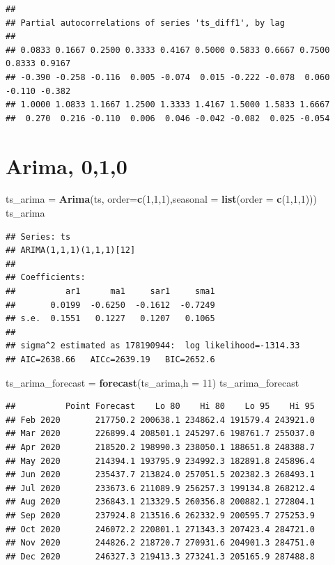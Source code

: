 \documentclass[
]{article}
\newenvironment{Shaded}{\begin{snugshade}}{\end{snugshade}}
\newcommand{\DataTypeTok}[1]{\textcolor[rgb]{0.13,0.29,0.53}{#1}}
\newcommand{\DecValTok}[1]{\textcolor[rgb]{0.00,0.00,0.81}{#1}}
\newcommand{\KeywordTok}[1]{\textcolor[rgb]{0.13,0.29,0.53}{\textbf{#1}}}
\newcommand{\NormalTok}[1]{#1}
\newcommand{\StringTok}[1]{\textcolor[rgb]{0.31,0.60,0.02}{#1}}
\begin{document}
\begin{verbatim}
## 
## Partial autocorrelations of series 'ts_diff1', by lag
## 
## 0.0833 0.1667 0.2500 0.3333 0.4167 0.5000 0.5833 0.6667 0.7500 0.8333 0.9167 
## -0.390 -0.258 -0.116  0.005 -0.074  0.015 -0.222 -0.078  0.060 -0.110 -0.382 
## 1.0000 1.0833 1.1667 1.2500 1.3333 1.4167 1.5000 1.5833 1.6667 
##  0.270  0.216 -0.110  0.006  0.046 -0.042 -0.082  0.025 -0.054
\end{verbatim}

\hypertarget{arima-010}{%
\section{Arima, 0,1,0}\label{arima-010}}

\begin{Shaded}
\begin{Highlighting}[]
\NormalTok{ts_arima =}\StringTok{ }\KeywordTok{Arima}\NormalTok{(ts, }\DataTypeTok{order=}\KeywordTok{c}\NormalTok{(}\DecValTok{1}\NormalTok{,}\DecValTok{1}\NormalTok{,}\DecValTok{1}\NormalTok{),}\DataTypeTok{seasonal =} \KeywordTok{list}\NormalTok{(}\DataTypeTok{order =} \KeywordTok{c}\NormalTok{(}\DecValTok{1}\NormalTok{,}\DecValTok{1}\NormalTok{,}\DecValTok{1}\NormalTok{)))}
\NormalTok{ts_arima}
\end{Highlighting}
\end{Shaded}

\begin{verbatim}
## Series: ts 
## ARIMA(1,1,1)(1,1,1)[12] 
## 
## Coefficients:
##          ar1      ma1     sar1     sma1
##       0.0199  -0.6250  -0.1612  -0.7249
## s.e.  0.1551   0.1227   0.1207   0.1065
## 
## sigma^2 estimated as 178190944:  log likelihood=-1314.33
## AIC=2638.66   AICc=2639.19   BIC=2652.6
\end{verbatim}

\begin{Shaded}
\begin{Highlighting}[]
\NormalTok{ts_arima_forecast =}\StringTok{ }\KeywordTok{forecast}\NormalTok{(ts_arima,}\DataTypeTok{h =} \DecValTok{11}\NormalTok{)}
\NormalTok{ts_arima_forecast}
\end{Highlighting}
\end{Shaded}

\begin{verbatim}
##          Point Forecast    Lo 80    Hi 80    Lo 95    Hi 95
## Feb 2020       217750.2 200638.1 234862.4 191579.4 243921.0
## Mar 2020       226899.4 208501.1 245297.6 198761.7 255037.0
## Apr 2020       218520.2 198990.3 238050.1 188651.8 248388.7
## May 2020       214394.1 193795.9 234992.3 182891.8 245896.4
## Jun 2020       235437.7 213824.0 257051.5 202382.3 268493.1
## Jul 2020       233673.6 211089.9 256257.3 199134.8 268212.4
## Aug 2020       236843.1 213329.5 260356.8 200882.1 272804.1
## Sep 2020       237924.8 213516.6 262332.9 200595.7 275253.9
## Oct 2020       246072.2 220801.1 271343.3 207423.4 284721.0
## Nov 2020       244826.2 218720.7 270931.6 204901.3 284751.0
## Dec 2020       246327.3 219413.3 273241.3 205165.9 287488.8
\end{verbatim}
\end{document}
